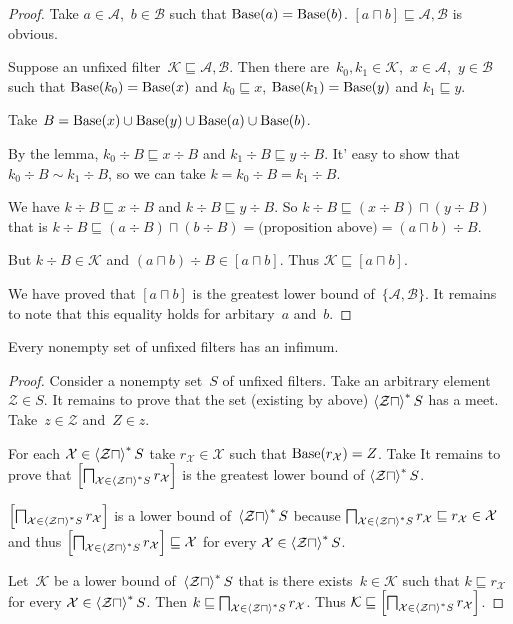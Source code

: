 \begin{proof}
Take $a\in\mathcal{A}$,~$b\in\mathcal{B}$ such that
$\operatorname{Base}(a)=\operatorname{Base}(b)$.
$[a\sqcap b]\sqsubseteq\mathcal{A},\mathcal{B}$ is obvious.

Suppose an unfixed
filter~$\mathcal{K}\sqsubseteq\mathcal{A},\mathcal{B}$.
Then there are~$k_0,k_1\in\mathcal{K}$,~$x\in\mathcal{A}$,~$y\in\mathcal{B}$ such
that $\operatorname{Base}(k_0)=\operatorname{Base}(x)$ and $k_0\sqsubseteq x$,
$\operatorname{Base}(k_1)=\operatorname{Base}(y)$ and $k_1\sqsubseteq y$.

Take $B=\operatorname{Base}(x)\cup\operatorname{Base}(y)\cup\operatorname{Base}(a)\cup\operatorname{Base}(b)$.

By the lemma, $k_0\div B \sqsubseteq
x\div B$ and
$k_1\div B \sqsubseteq
y\div B$. It' easy to show that
$k_0\div B \sim k_1\div B$, so we can take
$k=k_0\div B=k_1\div B$.

We have $k\div B\sqsubseteq x\div B$ and
$k\div B\sqsubseteq y\div B$. So
$k\div B\sqsubseteq(x\div B)\sqcap(y\div B)$ that is
$k\div B\sqsubseteq(a\div B)\sqcap(b\div B) =
\text{(proposition above)} =
(a\sqcap b)\div B$.

But $k\div B\in\mathcal{K}$ and
$(a\sqcap b)\div B\in[a\sqcap b]$. Thus
$\mathcal{K}\sqsubseteq[a\sqcap b]$.

We have proved that $[a\sqcap b]$ is the greatest lower
bound of~$\{\mathcal{A},\mathcal{B}\}$. It remains to note
that this equality holds for arbitary~$a$ and~$b$.
\end{proof}

\begin{thm}
Every nonempty set of unfixed filters has an infimum.
\end{thm}

\begin{proof}
Consider a nonempty set~$S$ of unfixed filters.
Take an arbitrary element $\mathcal{Z}\in S$. It remains
to prove that the set (existing by above)
$\left\langle \mathcal{Z}\sqcap\right\rangle ^{\ast}S$ has a meet.
Take~$z\in\mathcal{Z}$ and~$Z\in z$.

For each $\mathcal{X}\in\left\langle \mathcal{Z}\sqcap\right\rangle ^{\ast}S$ take
$r_{\mathcal{X}}\in\mathcal{X}$ such that
$\operatorname{Base}(r_{\mathcal{X}})=Z$. Take 
It remains to prove that
$\left[\bigsqcap_{\mathcal{X}\in\left\langle \mathcal{Z}\sqcap\right\rangle ^{\ast}S}r_{\mathcal{X}}\right]$ is the greatest lower bound of
$\left\langle \mathcal{Z}\sqcap\right\rangle ^{\ast}S$.

$\left[\bigsqcap_{\mathcal{X}\in\left\langle \mathcal{Z}\sqcap\right\rangle ^{\ast}S}r_{\mathcal{X}}\right]$ is a lower bound
of~$\left\langle \mathcal{Z}\sqcap\right\rangle ^{\ast}S$ because
$\bigsqcap_{\mathcal{X}\in\left\langle \mathcal{Z}\sqcap\right\rangle ^{\ast}S}r_{\mathcal{X}} \sqsubseteq r_{\mathcal{X}}\in\mathcal{X}$
and thus $\left[\bigsqcap_{\mathcal{X}\in\left\langle \mathcal{Z}\sqcap\right\rangle ^{\ast}S}r_{\mathcal{X}}\right]\sqsubseteq\mathcal{X}$
for every $\mathcal{X}\in\left\langle \mathcal{Z}\sqcap\right\rangle ^{\ast}S$.

Let~$\mathcal{K}$ be a lower bound
of~$\left\langle \mathcal{Z}\sqcap\right\rangle ^{\ast}S$ that is
there exists~$k\in\mathcal{K}$ such that
$k\sqsubseteq r_{\mathcal{X}}$
for every $\mathcal{X}\in\left\langle \mathcal{Z}\sqcap\right\rangle ^{\ast}S$.
Then $k\sqsubseteq\bigsqcap_{\mathcal{X}\in\left\langle \mathcal{Z}\sqcap\right\rangle ^{\ast}S}r_{\mathcal{X}}$.
Thus $\mathcal{K} \sqsubseteq \left[\bigsqcap_{\mathcal{X}\in\left\langle \mathcal{Z}\sqcap\right\rangle ^{\ast}S}r_{\mathcal{X}}\right]$.
\end{proof}

